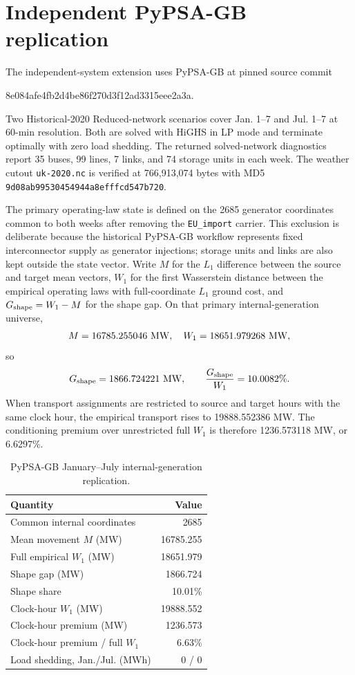 \documentclass[10pt,journal,onecolumn]{IEEEtran}
\begin{document}
\FloatBarrier
\section{Independent PyPSA-GB replication}
The independent-system extension uses PyPSA-GB \cite{Lyden2024} at pinned source commit
\begin{center}\ttfamily\small
8e084afe4fb2d4be86f270d3f12ad3315eee2a3a.
\end{center}
Two Historical-2020 Reduced-network scenarios cover Jan. 1--7 and Jul. 1--7 at 60-min resolution. Both are solved with HiGHS in LP mode and terminate optimally with zero load shedding. The returned solved-network diagnostics report 35 buses, 99 lines, 7 links, and 74 storage units in each week. The weather cutout \texttt{uk-2020.nc} is verified at 766,913,074 bytes with MD5 \texttt{9d08ab99530454944a8efffcd547b720}.

The primary operating-law state is defined on the 2685 generator coordinates common to both weeks after removing the \texttt{EU\_import} carrier. This exclusion is deliberate because the historical PyPSA-GB workflow represents fixed interconnector supply as generator injections; storage units and links are also kept outside the state vector. Write $M$ for the $L_1$ difference between the source and target mean vectors, $W_1$ for the first Wasserstein distance between the empirical operating laws with full-coordinate $L_1$ ground cost, and $G_{\rm shape}=W_1-M$ for the shape gap. On that primary internal-generation universe,
\[
M=16785.255046\ {\rm MW},\quad
W_1=18651.979268\ {\rm MW},
\]
so
\[
G_{\rm shape}=1866.724221\ {\rm MW},
\qquad
\frac{G_{\rm shape}}{W_1}=10.0082\%.
\]
When transport assignments are restricted to source and target hours with the same clock hour, the empirical transport rises to 19888.552386 MW. The conditioning premium over unrestricted full $W_1$ is therefore 1236.573118 MW, or 6.6297\%.

\begin{table}[t]
\centering
\caption{PyPSA-GB January--July internal-generation replication.}
\label{tab:supp-gb}
\begin{tabular}{lr}
\toprule
Quantity & Value\\
\midrule
Common internal coordinates & 2685\\
Mean movement $M$ (MW) & 16785.255\\
Full empirical $W_1$ (MW) & 18651.979\\
Shape gap (MW) & 1866.724\\
Shape share & 10.01\%\\
Clock-hour $W_1$ (MW) & 19888.552\\
Clock-hour premium (MW) & 1236.573\\
Clock-hour premium / full $W_1$ & 6.63\%\\
Load shedding, Jan./Jul. (MWh) & 0 / 0\\
\bottomrule
\end{tabular}
\end{table}
\end{document}
